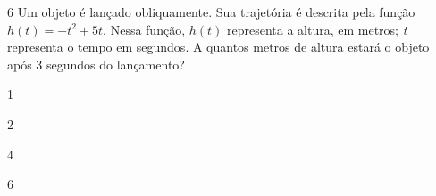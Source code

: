 \begin{escolha}
\begin{boxmedio}
\begin{boxmedio}
{\begin{boxpeq}
\begin{boxpeq}
{\begin{boxpeq}
\begin{boxmedio}
\begin{boxmedio}
\begin{boxpeq}
\begin{boxmedio}
\begin{boxpeq}
\begin{boxpeq}
\begin{boxpeq}
\begin{boxpeq}
\begin{boxmedio}
{\begin{boxmedio}
\begin{boxmedio}
\begin{boxpeq}
\begin{boxmedio}
\begin{boxpeq}
\begin{boxpeq}
\begin{boxpeq}
\begin{escolha}
{\begin{boxmedio}
\begin{boxpeq}
\begin{boxpeq}
\begin{boxpeq}
\begin{boxpeq}
\begin{boxpeq}
\begin{boxmedio}
\begin{boxpeq}
\begin{boxpeq}
\begin{boxpeq}
{\begin{boxpeq}
\begin{boxmedio}
\begin{boxpeq}
\begin{boxpeq}
\begin{boxpeq}
{\begin{boxpeq}
\begin{boxmedio}
{\begin{boxpeq}
\begin{boxpeq}
\begin{boxmedio}
\begin{boxmedio}
\begin{boxpeq}
\begin{boxpeq}
{\begin{boxpeq}
\begin{boxpeq}
\begin{boxpeq}
\begin{boxpeq}
\begin{boxpeq}
\begin{escolha}
\begin{escolha}
{\begin{boxmedio}
\begin{boxpeq}
\begin{q°}
\begin{boxmedio}
\begin{boxpeq}
\begin{boxpeq}
\begin{boxmedio}
\begin{boxmedio}
\begin{boxmedio}
\begin{boxmedio}
{\begin{enumerate}
\begin{boxpeq}
{\begin{boxpeq}
\begin{boxpeq}
\begin{boxmedio}
\begin{boxpeq}
\begin{boxpeq}
\begin{boxpeq}
\num{6} Um objeto é lançado obliquamente. Sua trajetória é descrita pela
função $h(t) = - t^{2} + 5t$. Nessa função, $h(t)$ representa a altura, em
metros; \textit{t} representa o tempo em segundos. A quantos metros de altura
estará o objeto após 3 segundos do lançamento?

\begin{escolha}

  \item 1

  \item 2

  \item 4

  \item 6

\begin{escolha}

\end{escolha}
\end{escolha}
\end{boxpeq}
\end{boxpeq}
\end{boxpeq}
\end{boxmedio}
\end{boxpeq}
\end{boxpeq}}
\end{boxpeq}
\end{enumerate}}
\end{boxmedio}
\end{boxmedio}
\end{boxmedio}
\end{boxmedio}
\end{boxpeq}
\end{boxpeq}
\end{boxmedio}
\end{q°}
\end{boxpeq}
\end{boxmedio}}
\end{escolha}
\end{escolha}
\end{boxpeq}
\end{boxpeq}
\end{boxpeq}
\end{boxpeq}
\end{boxpeq}}
\end{boxpeq}
\end{boxpeq}
\end{boxmedio}
\end{boxmedio}
\end{boxpeq}
\end{boxpeq}}
\end{boxmedio}
\end{boxpeq}}
\end{boxpeq}
\end{boxpeq}
\end{boxpeq}
\end{boxmedio}
\end{boxpeq}}
\end{boxpeq}
\end{boxpeq}
\end{boxpeq}
\end{boxmedio}
\end{boxpeq}
\end{boxpeq}
\end{boxpeq}
\end{boxpeq}
\end{boxpeq}
\end{boxmedio}}
\end{escolha}
\end{boxpeq}
\end{boxpeq}
\end{boxpeq}
\end{boxmedio}
\end{boxpeq}
\end{boxmedio}
\end{boxmedio}}
\end{boxmedio}
\end{boxpeq}
\end{boxpeq}
\end{boxpeq}
\end{boxpeq}
\end{boxmedio}
\end{boxpeq}
\end{boxmedio}
\end{boxmedio}
\end{boxpeq}}
\end{boxpeq}
\end{boxpeq}}
\end{boxmedio}
\end{boxmedio}
\end{escolha}
